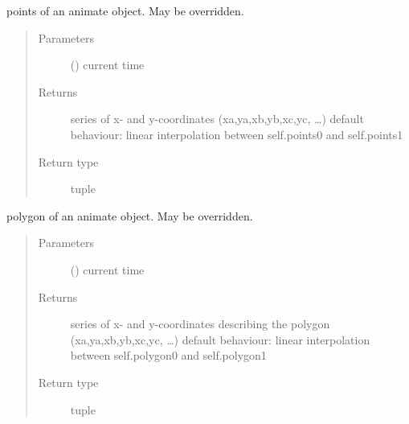 \documentclass[letterpaper,10pt,english]{sphinxmanual}
\begin{document}
\begin{fulllineitems}
\begin{fulllineitems}
\label{\detokenize{Reference:salabim.Animate.points}}
points of an animate object. May be overridden.
\begin{quote}\begin{description}
\item[{Parameters}] \leavevmode
{} () \textendash{} current time

\item[{Returns}] \leavevmode
{} \textendash{} series of x- and y-coordinates (xa,ya,xb,yb,xc,yc, …) 
default behaviour: linear interpolation between self.points0 and self.points1

\item[{Return type}] \leavevmode
tuple

\end{description}\end{quote}

\end{fulllineitems}


\begin{fulllineitems}
\label{\detokenize{Reference:salabim.Animate.polygon}}
polygon of an animate object. May be overridden.
\begin{quote}\begin{description}
\item[{Parameters}] \leavevmode
{} () \textendash{} current time

\item[{Returns}] \leavevmode
{} \textendash{} series of x- and y-coordinates describing the polygon (xa,ya,xb,yb,xc,yc, …) 
default behaviour: linear interpolation between self.polygon0 and self.polygon1

\item[{Return type}] \leavevmode
tuple

\end{description}\end{quote}

\end{fulllineitems}


\end{fulllineitems}
\end{document}
